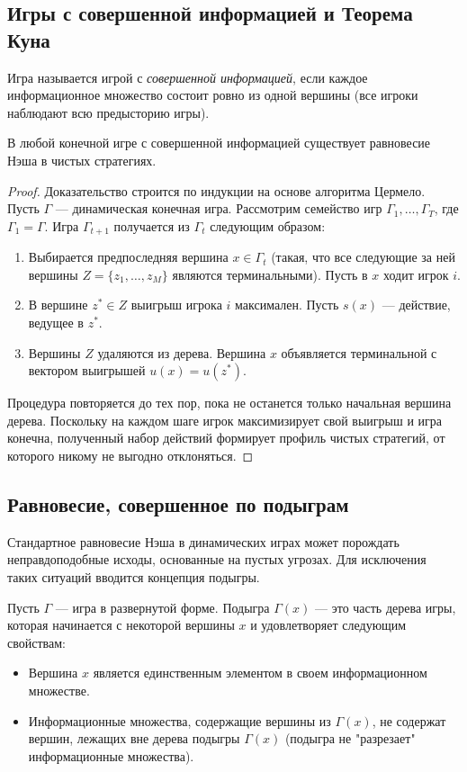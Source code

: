 \subsection{Игры с совершенной информацией и Теорема Куна}

Игра называется игрой с \textit{совершенной информацией}, если каждое информационное множество состоит ровно из одной вершины (все игроки наблюдают всю предысторию игры).

\begin{theorem}[Кун, 1953]\label{thm:kuhn_perfect}
В любой конечной игре с совершенной информацией существует равновесие Нэша в чистых стратегиях.
\end{theorem}

\begin{proof}
Доказательство строится по индукции на основе алгоритма Цермело. Пусть $\Gamma$ — динамическая конечная игра. Рассмотрим семейство игр $\Gamma_1, \dots, \Gamma_T$, где $\Gamma_1 = \Gamma$. Игра $\Gamma_{t+1}$ получается из $\Gamma_t$ следующим образом:
\begin{enumerate}
    \item Выбирается предпоследняя вершина $x \in \Gamma_t$ (такая, что все следующие за ней вершины $Z = \{z_1, \dots, z_M\}$ являются терминальными). Пусть в $x$ ходит игрок $i$.
    \item В вершине $z^* \in Z$ выигрыш игрока $i$ максимален. Пусть $s(x)$ — действие, ведущее в $z^*$.
    \item Вершины $Z$ удаляются из дерева. Вершина $x$ объявляется терминальной с вектором выигрышей $u(x) = u(z^*)$.
\end{enumerate}
Процедура повторяется до тех пор, пока не останется только начальная вершина дерева. Поскольку на каждом шаге игрок максимизирует свой выигрыш и игра конечна, полученный набор действий формирует профиль чистых стратегий, от которого никому не выгодно отклоняться.
\end{proof}

\subsection{Равновесие, совершенное по подыграм}

Стандартное равновесие Нэша в динамических играх может порождать неправдоподобные исходы, основанные на пустых угрозах. Для исключения таких ситуаций вводится концепция подыгры.

\begin{definition}[Подыгра]
Пусть $\Gamma$ — игра в развернутой форме. Подыгра $\Gamma(x)$ — это часть дерева игры, которая начинается с некоторой вершины $x$ и удовлетворяет следующим свойствам:
\begin{itemize}
    \item Вершина $x$ является единственным элементом в своем информационном множестве.
    \item Информационные множества, содержащие вершины из $\Gamma(x)$, не содержат вершин, лежащих вне дерева подыгры $\Gamma(x)$ (подыгра не "разрезает" информационные множества).
\end{itemize}
\end{definition}

